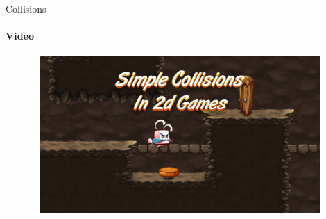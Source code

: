 \documentclass[aspectratio=169]{beamer}
\begin{document}
\begin{frame}[t]{Collisions}
    \framesubtitle{Video}
    \vspace{-0.6cm}
    \begin{figure}[H]
        \href{https://youtu.be/aTbw71EpamY}{
            \centering\includegraphics[height=6cm,width=1\textwidth,keepaspectratio]{collisions.jpg}}
        \label{fig:collisions.jpg}
    \end{figure}
\end{frame}
\end{document}
